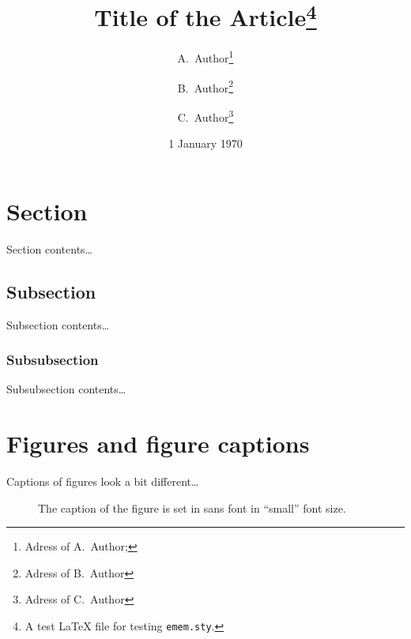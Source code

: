 \documentclass{article}
\title{Title of the Article\thanks{A test {\LaTeX} file for testing \texttt{emem.sty}.}}
\author{%
  A.~Author\thanks{Adress of A.~Author; \email{a.author@mail.zz}} \and%
  B.~Author\thanks{Adress of B.~Author} \and%
  C.~Author\thanks{Adress of C.~Author}%
}
\date{1 January 1970}
\begin{document}
\maketitle

\begin{abstract}
  \lipsum[1]
\end{abstract}

\section{Section}

Section contents\ldots \lipsum[1]

\subsection{Subsection}

Subsection contents\ldots \lipsum[2]

\subsubsection{Subsubsection}

Subsubsection contents\ldots \lipsum[3]

\section{Figures and figure captions}

Captions of figures look a bit different\ldots
\begin{figure}[h]
  \begin{center}
  \end{center}
  \caption{The caption of the figure is set in sans font in ``small'' font size.}
\end{figure}
\end{document}
